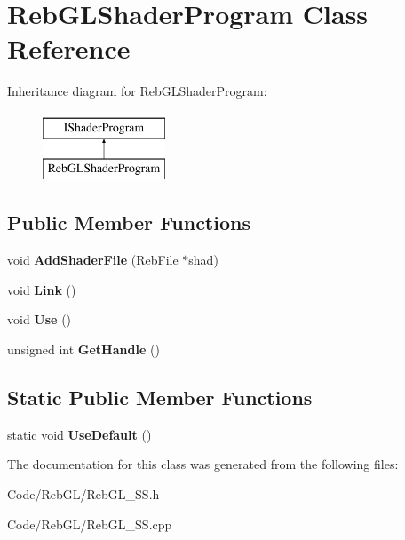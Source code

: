 \hypertarget{class_reb_g_l_shader_program}{}\section{Reb\+G\+L\+Shader\+Program Class Reference}
\label{class_reb_g_l_shader_program}
Inheritance diagram for Reb\+G\+L\+Shader\+Program\+:\begin{figure}[H]
\begin{center}
\leavevmode
\includegraphics[height=2.000000cm]{class_reb_g_l_shader_program}
\end{center}
\end{figure}
\subsection*{Public Member Functions}
\begin{DoxyCompactItemize}
\item 
void {\bfseries Add\+Shader\+File} (\hyperlink{class_reb_file}{Reb\+File} $\ast$shad)\hypertarget{class_reb_g_l_shader_program_a6f6bdc8de8a2a98b7eb0e43bfcafa687}{}\label{class_reb_g_l_shader_program_a6f6bdc8de8a2a98b7eb0e43bfcafa687}

\item 
void {\bfseries Link} ()\hypertarget{class_reb_g_l_shader_program_a5473f8f4feecef9edd83bb18186b40e1}{}\label{class_reb_g_l_shader_program_a5473f8f4feecef9edd83bb18186b40e1}

\item 
void {\bfseries Use} ()\hypertarget{class_reb_g_l_shader_program_a6271d7b193652c1374c99779ed54e9fd}{}\label{class_reb_g_l_shader_program_a6271d7b193652c1374c99779ed54e9fd}

\item 
unsigned int {\bfseries Get\+Handle} ()\hypertarget{class_reb_g_l_shader_program_a1dc4253dbb32ef96cb1e53d1b02697e3}{}\label{class_reb_g_l_shader_program_a1dc4253dbb32ef96cb1e53d1b02697e3}

\end{DoxyCompactItemize}
\subsection*{Static Public Member Functions}
\begin{DoxyCompactItemize}
\item 
static void {\bfseries Use\+Default} ()\hypertarget{class_reb_g_l_shader_program_a646154a0750ce9e03613fa01d6d5f673}{}\label{class_reb_g_l_shader_program_a646154a0750ce9e03613fa01d6d5f673}

\end{DoxyCompactItemize}


The documentation for this class was generated from the following files\+:\begin{DoxyCompactItemize}
\item 
Code/\+Reb\+G\+L/Reb\+G\+L\+\_\+\+S\+S.\+h\item 
Code/\+Reb\+G\+L/Reb\+G\+L\+\_\+\+S\+S.\+cpp\end{DoxyCompactItemize}
